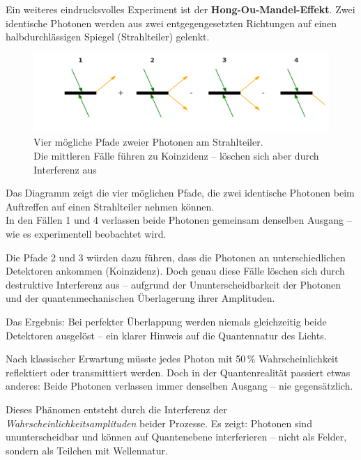 Ein weiteres eindrucksvolles Experiment ist der \textbf{Hong-Ou-Mandel-Effekt}. Zwei identische Photonen werden aus zwei entgegengesetzten Richtungen auf einen halbdurchlässigen Spiegel (Strahlteiler) gelenkt.
\begin{figure}[H]
	\begin{center}
		\includegraphics[width=0.95\linewidth]{bilder/hom_interferenzpfade_korrigiert.png}
		
	\end{center}
	\caption{Vier mögliche Pfade zweier Photonen am Strahlteiler.\\
		Die mittleren Fälle führen zu Koinzidenz – löschen sich aber durch Interferenz aus}
\end{figure}

\begin{tcolorbox}[hinweisbox, title=Was diese Darstellung zeigt]
	\label{box:was diese Darstellun}
	\small
	Das Diagramm zeigt die vier möglichen Pfade, die zwei identische Photonen beim Auftreffen auf einen Strahlteiler nehmen können.\\
	In den Fällen 1 und 4 verlassen beide Photonen gemeinsam denselben Ausgang – wie es experimentell beobachtet wird.
	
	Die Pfade 2 und 3 würden dazu führen, dass die Photonen an unterschiedlichen Detektoren ankommen (Koinzidenz). Doch genau diese Fälle löschen sich durch destruktive Interferenz aus – aufgrund der Ununterscheidbarkeit der Photonen und der quantenmechanischen Überlagerung ihrer Amplituden.
	
	Das Ergebnis: Bei perfekter Überlappung werden niemals gleichzeitig beide Detektoren ausgelöst – ein klarer Hinweis auf die Quantennatur des Lichts.
\end{tcolorbox}

Nach klassischer Erwartung müsste jedes Photon mit 50\,\% Wahrscheinlichkeit reflektiert oder transmittiert werden. Doch in der Quantenrealität passiert etwas anderes: Beide Photonen verlassen immer denselben Ausgang – nie gegensätzlich.

Dieses Phänomen entsteht durch die Interferenz der \emph{Wahrscheinlichkeitsamplituden} beider Prozesse. Es zeigt: Photonen sind ununterscheidbar und können auf Quantenebene interferieren – nicht als Felder, sondern als Teilchen mit Wellennatur.

